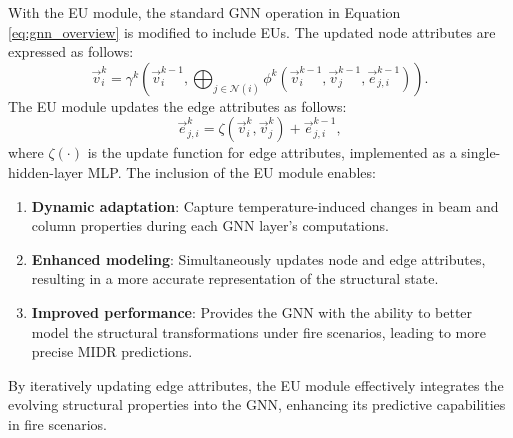 With the EU module, the standard GNN operation in Equation \eqref{eq:gnn_overview} is modified to include EUs. The updated node attributes are expressed as follows:
\begin{equation}
    \label{eq:gnn_with_edge_update}
    \vec{v}_i^k = \gamma^k \left( \vec{v}_i^{k-1}, \bigoplus_{j \in \mathcal{N}(i)} \phi^k \left( \vec{v}_i^{k-1}, \vec{v}_j^{k-1}, \vec{e}_{j,i}^{k-1} \right) \right).
\end{equation}
The EU module updates the edge attributes as follows:
\begin{equation}
    \label{eq:edge_update}
    \vec{e}_{j,i}^k = \zeta \left( \vec{v}_i^{k}, \vec{v}_j^{k} \right) + \vec{e}_{j,i}^{k-1},
\end{equation}
where $\zeta(\cdot)$ is the update function for edge attributes, implemented as a single-hidden-layer MLP. The inclusion of the EU module enables:
\begin{enumerate}
    \item {\bf{Dynamic adaptation}}: Capture temperature-induced changes in beam and column properties during each GNN layer's computations.
    \item {\bf{Enhanced modeling}}: Simultaneously updates node and edge attributes, resulting in a more accurate representation of the structural state.
    \item {\bf{Improved performance}}: Provides the GNN with the ability to better model the structural transformations under fire scenarios, leading to more precise MIDR predictions.
\end{enumerate}    
By iteratively updating edge attributes, the EU module effectively integrates the evolving structural properties into the GNN, enhancing its predictive capabilities in fire scenarios.

